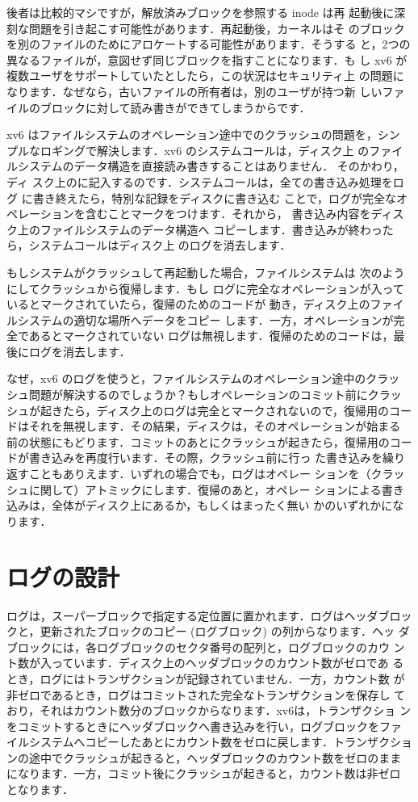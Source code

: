 後者は比較的マシですが，解放済みブロックを参照する inode は再
起動後に深刻な問題を引き起こす可能性があります．再起動後，カーネルはそ
のブロックを別のファイルのためにアロケートする可能性があります．そうする
と，2つの異なるファイルが，意図せず同じブロックを指すことになります．も
し xv6 が複数ユーザをサポートしていたとしたら，この状況はセキュリティ上
の問題になります．なぜなら，古いファイルの所有者は，別のユーザが持つ新
しいファイルのブロックに対して読み書きができてしまうからです．

xv6 はファイルシステムのオペレーション途中でのクラッシュの問題を，シン
プルなロギングで解決します．xv6 のシステムコールは，ディスク上
のファイルシステムのデータ構造を直接読み書きすることはありません．
そのかわり，ディ
スク上のに記入するのです．システムコールは，全ての書き込み処理をログ
に書き終えたら，特別な記録をディスクに書き込む
ことで，ログが完全なオペレーションを含むことマークをつけます．それから，
書き込み内容をディスク上のファイルシステムのデータ構造へ
コピーします．書き込みが終わったら，システムコールはディスク上
のログを消去します．

もしシステムがクラッシュして再起動した場合，ファイルシステムは
次のようにしてクラッシュから復帰します．もし
ログに完全なオペレーションが入っているとマークされていたら，復帰のためのコードが
動き，ディスク上のファイルシステムの適切な場所へデータをコピー
します．一方，オペレーションが完全であるとマークされていない
ログは無視します．復帰のためのコードは，最後にログを消去します．

なぜ，xv6 のログを使うと，ファイルシステムのオペレーション途中のクラッ
シュ問題が解決するのでしょうか？もしオペレーションのコミット前にクラッ
シュが起きたら，ディスク上のログは完全とマークされないので，復帰用のコー
ドはそれを無視します．その結果，ディスクは，そのオペレーションが始まる
前の状態にもどります．コミットのあとにクラッシュが起きたら，復帰用のコー
ドが書き込みを再度行います．その際，クラッシュ前に行っ
た書き込みを繰り返すこともありえます．いずれの場合でも，ログはオペレー
ションを（クラッシュに関して）アトミックにします．復帰のあと，オペレー
ションによる書き込みは，全体がディスク上にあるか，もしくはまったく無い
かのいずれかになります．

\section{ログの設計}

ログは，スーパーブロックで指定する定位置に置かれます．ログはヘッダブロッ
クと，更新されたブロックのコピー (ログブロック) の列からなります．ヘッ
ダブロックには，各ログブロックのセクタ番号の配列と，ログブロックのカウ
ント数が入っています．ディスク上のヘッダブロックのカウント数がゼロであ
るとき，ログにはトランザクションが記録されていません．一方，カウント数
が非ゼロであるとき，ログはコミットされた完全なトランザクションを保存し
ており，それはカウント数分のブロックからなります．xv6は，トランザクショ
ンをコミットするときにヘッダブロックへ書き込みを行い，ログブロックをファ
イルシステムへコピーしたあとにカウント数をゼロに戻します．トランザクショ
ンの途中でクラッシュが起きると，ヘッダブロックのカウント数をゼロのまま
になります．一方，コミット後にクラッシュが起きると，カウント数は非ゼロ
となります．

